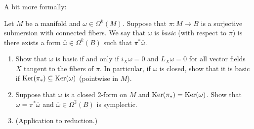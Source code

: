 A bit more formally:

\begin{definition}
\label{definition-basic-form}
Let $M$ be a manifold and $\omega \in \Omega^k(M)$.
Suppose that $\pi:M \to B$ is a surjective
submersion with connected fibers.
We say that $\omega$ is {\it basic} (with respect
to $\pi$) is there exists a form
$\overline{\omega}\in \Omega^k(B)$ such that
$\pi^*  \overline{\omega}$.
\end{definition}

\begin{exercise}
\label{exercise-basic-forms-characterization}
\begin{enumerate}
\item Show that $\omega$ is basic if and only if
$i_X \omega=0$ and $L_X\omega=0$
for all vector fields $X$ tangent
to the fibers of $\pi$.
In particular, if $\omega$ is closed,
show that it is basic if 
$\mathop{\mathrm{Ker}} (\pi_*) \subseteq \mathop{\mathrm{Ker}}(\omega)$
(pointwise in $M$).

\item Suppose that $\omega$ is a closed
2-form on $M$ and $\mathop{\mathrm{Ker}}(\pi_*)=\mathop{\mathrm{Ker}}(\omega)$.
Show that $\omega=\pi^*\overline{\omega}$
and $\overline{\omega}\in\Omega^2(B)$
is symplectic.

\item (Application to reduction.)
\end{enumerate}
\end{exercise}

